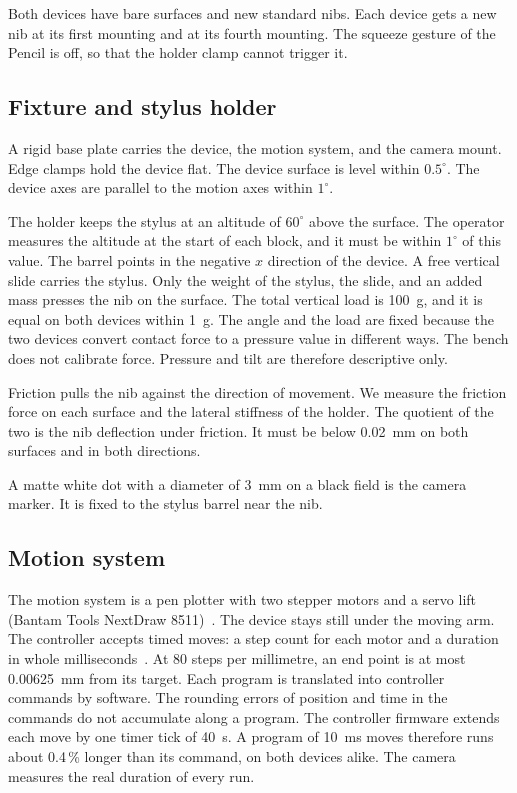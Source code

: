 Both devices have bare surfaces and new standard nibs.
Each device gets a new nib at its first mounting and at its fourth mounting.
The squeeze gesture of the Pencil is off, so that the holder clamp cannot trigger it.

\subsection{Fixture and stylus holder}
\label{sec:fixture}
A rigid base plate carries the device, the motion system, and the camera mount.
Edge clamps hold the device flat.
The device surface is level within $0.5^\circ$.
The device axes are parallel to the motion axes within $1^\circ$.

The holder keeps the stylus at an altitude of $60^\circ$ above the surface.
The operator measures the altitude at the start of each block, and it must be within $1^\circ$ of this value.
The barrel points in the negative $x$ direction of the device.
A free vertical slide carries the stylus.
Only the weight of the stylus, the slide, and an added mass presses the nib on the surface.
The total vertical load is 100~g, and it is equal on both devices within 1~g.
The angle and the load are fixed because the two devices convert contact force to a pressure value in different ways.
The bench does not calibrate force.
Pressure and tilt are therefore descriptive only.

Friction pulls the nib against the direction of movement.
We measure the friction force on each surface and the lateral stiffness of the holder.
The quotient of the two is the nib deflection under friction.
It must be below 0.02~mm on both surfaces and in both directions.

A matte white dot with a diameter of 3~mm on a black field is the camera marker.
It is fixed to the stylus barrel near the nib.

\subsection{Motion system}
\label{sec:motion}
The motion system is a pen plotter with two stepper motors and a servo lift (Bantam Tools NextDraw 8511)~\cite{NextDraw}.
The device stays still under the moving arm.
The controller accepts timed moves: a step count for each motor and a duration in whole milliseconds~\cite{EBB}.
At 80 steps per millimetre, an end point is at most 0.00625~mm from its target.
Each program is translated into controller commands by software.
The rounding errors of position and time in the commands do not accumulate along a program.
The controller firmware extends each move by one timer tick of 40~\textmu s.
A program of 10~ms moves therefore runs about 0.4\,\% longer than its command, on both devices alike.
The camera measures the real duration of every run.

